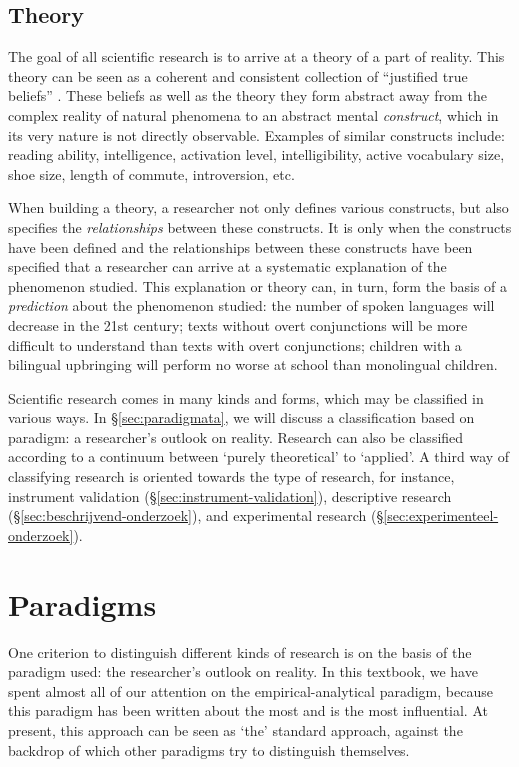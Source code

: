 \documentclass[
]{book}
\begin{document}
\hypertarget{sec:theory}{%
\subsection{Theory}\label{sec:theory}}

The goal of all scientific research is to arrive at a theory of a part of reality. This theory can be seen as a coherent and consistent collection of ``justified true beliefs'' \citep{Mort03}. These beliefs as well as the theory they form abstract away from the complex reality of natural phenomena to an abstract mental \emph{construct}, which in its very nature is not directly observable. Examples of similar constructs include: reading ability, intelligence, activation level, intelligibility, active vocabulary size, shoe size, length of commute, introversion, etc.

When building a theory, a researcher not only defines various constructs, but also specifies the \emph{relationships} between these constructs. It is only when the constructs have been defined and the relationships between these constructs have been specified that a researcher can arrive at a systematic explanation of the phenomenon studied. This explanation or theory can, in turn, form the basis of a \emph{prediction} about the phenomenon studied: the number of spoken languages will decrease in the 21st century; texts without overt conjunctions will be more difficult to understand than texts with overt conjunctions; children with a bilingual upbringing will perform no worse at school than monolingual children.

Scientific research comes in many kinds and forms, which may be classified in various ways. In §\ref{sec:paradigmata}, we will discuss a classification based on paradigm: a researcher's outlook on reality. Research can also be classified according to a continuum between `purely theoretical' to `applied'. A third way of classifying research is oriented towards the type of research, for instance, instrument validation (§\ref{sec:instrument-validation}), descriptive research (§\ref{sec:beschrijvend-onderzoek}), and experimental research (§\ref{sec:experimenteel-onderzoek}).

\hypertarget{sec:paradigms}{%
\section{Paradigms}\label{sec:paradigms}}

One criterion to distinguish different kinds of research is on the basis of the paradigm used: the researcher's outlook on reality. In this textbook, we have spent almost all of our attention on the empirical-analytical paradigm, because this paradigm has been written about the most and is the most influential. At present, this approach can be seen as `the' standard approach, against the backdrop of which other paradigms try to distinguish themselves.
\end{document}
